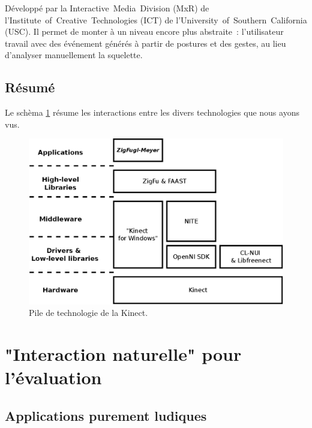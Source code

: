 \documentclass[french,12pt]{report}
\begin{document}
  Développé par la Interactive~Media~Division (MxR) de 
  l'Institute~of~Creative~Technologies (ICT) de 
  l'University~of~Southern~California (USC). Il permet de monter à un niveau 
  encore plus abstraite~: l'utilisateur travail avec des événement générés à
  partir de postures et des gestes, au lieu d'analyser manuellement la 
  squelette.
  
  
  \subsection{Résumé}
  Le schèma \ref{fig:technology_overview} résume les interactions entre les divers 
  technologies que nous ayons vus.
  
  \begin{figure}[h!]
  \centering
  \includegraphics[width=0.9\linewidth]{images/technology_overview}
  \caption{Pile de technologie de la Kinect.}
  \label{fig:technology_overview}
  \end{figure}
  
  
  \section{"Interaction naturelle" pour l'évaluation}
		
  \subsection{Applications purement ludiques}
  
\end{document}
